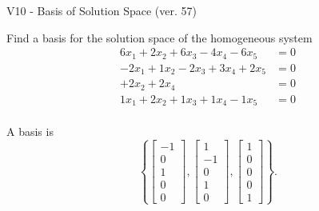 \begin{exercise}
  \begin{exerciseTitle}V10 - Basis of Solution Space (ver. 57)\end{exerciseTitle}
  \begin{exerciseStatement}
    Find a basis for the solution space of the homogeneous system 
\begin{align*}
 6 x_ 1 + 2 x_ 2 + 6 x_ 3 -4 x_ 4 -6 x_ 5 &= 0  \\ 
  -2 x_ 1 + 1 x_ 2 -2 x_ 3 + 3 x_ 4 + 2 x_ 5 &= 0  \\ 
  + 2 x_ 2 + 2 x_ 4 &= 0  \\ 
  1 x_ 1 + 2 x_ 2 + 1 x_ 3 + 1 x_ 4 -1 x_ 5 &= 0  \\ 
 \end{align*}


 
  \end{exerciseStatement}

  \begin{exerciseAnswer}
   A basis is   
\[\left\{\left[\begin{array}{c}
-1 \\
0 \\
1 \\
0 \\
0
\end{array}\right] , \left[\begin{array}{c}
1 \\
-1 \\
0 \\
1 \\
0
\end{array}\right] , \left[\begin{array}{c}
1 \\
0 \\
0 \\
0 \\
1
\end{array}\right]\right\}.\]

  


  \end{exerciseAnswer}
\end{exercise}